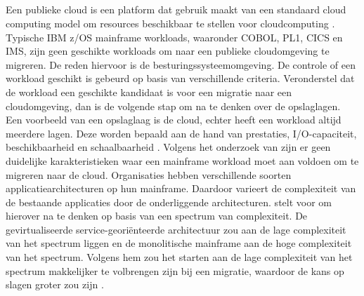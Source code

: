 \subsection{}
\label{sec:Welke workloads kunnen gemigreerd worden naar de cloud?}

Een publieke cloud is een platform dat gebruik maakt van een standaard cloud computing model om resources beschikbaar te stellen voor cloudcomputing \autocite{Allison2016}. Typische IBM z/OS mainframe workloads, waaronder COBOL, PL1, CICS en IMS, zijn geen geschikte workloads om naar een publieke cloudomgeving te migreren. De reden hiervoor is de besturingssysteemomgeving. De controle of een workload geschikt is gebeurd op basis van verschillende criteria. Veronderstel dat de workload een geschikte kandidaat is voor een migratie naar een cloudomgeving, dan is de volgende stap om na te denken over de opslaglagen. Een voorbeeld van een opslaglaag is de cloud, echter heeft een workload altijd meerdere lagen. Deze worden bepaald aan de hand van prestaties, I/O-capaciteit, beschikbaarheid en schaalbaarheid \autocite{Allison2016}. Volgens het onderzoek van \textcite{Martikainen2018} zijn er geen duidelijke karakteristieken waar een mainframe workload moet aan voldoen om te migreren naar de cloud. Organisaties hebben verschillende soorten applicatiearchitecturen op hun mainframe. Daardoor varieert de complexiteit van de bestaande applicaties door de onderliggende architecturen. \textcite{Orban2016} stelt voor om hierover na te denken op basis van een spectrum van complexiteit. De gevirtualiseerde service-georiënteerde architectuur zou aan de lage complexiteit van het spectrum liggen en de monolitische mainframe aan de hoge complexiteit van het spectrum. Volgens hem zou het starten aan de lage complexiteit van het spectrum makkelijker te volbrengen zijn bij een migratie, waardoor de kans op slagen groter zou zijn \autocite{Orban2016}. 

